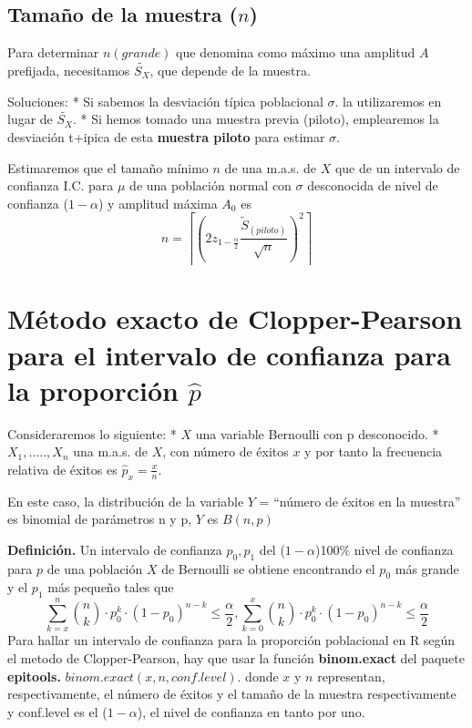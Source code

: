 \documentclass[
]{article}
\begin{document}
\hypertarget{tamauxf1o-de-la-muestra-n}{%
\subsection{\texorpdfstring{Tamaño de la muestra
(\(n\))}{Tamaño de la muestra (n)}}\label{tamauxf1o-de-la-muestra-n}}

Para determinar \(n (grande)\) que denomina como máximo una amplitud
\(A\) prefijada, necesitamos \(\tilde{S_X}\), que depende de la muestra.

Soluciones: * Si sabemos la desviación típica poblacional \(\sigma\). la
utilizaremos en lugar de \(\tilde{S_X}\). * Si hemos tomado una muestra
previa (piloto), emplearemos la desviación t+ipica de esta
\textbf{muestra piloto} para estimar \(\sigma\).

Estimaremos que el tamaño mínimo \(n\) de una m.a.s. de \(X\) que de un
intervalo de confianza I.C. para \(\mu\) de una población normal con
\(\sigma\) desconocida de nivel de confianza (\(1-\alpha\)) y amplitud
máxima \(A_0\) es
\[n = \left\lceil\left(2z_{1-\frac{\alpha}{2}}\frac{\tilde{S}_(piloto)}{\sqrt{n}}\right)^2\right\rceil\]

\hypertarget{muxe9todo-exacto-de-clopper-pearson-para-el-intervalo-de-confianza-para-la-proporciuxf3n-hatp}{%
\section{\texorpdfstring{Método exacto de Clopper-Pearson para el
intervalo de confianza para la proporción
\(\hat{p}\)}{Método exacto de Clopper-Pearson para el intervalo de confianza para la proporción \textbackslash hat\{p\}}}\label{muxe9todo-exacto-de-clopper-pearson-para-el-intervalo-de-confianza-para-la-proporciuxf3n-hatp}}

Consideraremos lo siguiente: * \(X\) una variable Bernoulli con p
desconocido. * \(X_1,.....,X_n\) una m.a.s. de \(X\), con número de
éxitos \(x\) y por tanto la frecuencia relativa de éxitos es
\(\hat{p}_x = \frac{x}{n}\).

En este caso, la distribución de la variable \(Y\) = ``número de éxitos
en la muestra'' es binomial de parámetros n y p, \(Y\) es \(B(n,p)\)

\textbf{Definición.} Un intervalo de confianza \(p_0,p_1\) del
(\(1 -\alpha\))100\% nivel de confianza para \(p\) de una población
\(X\) de Bernoulli se obtiene encontrando el \(p_0\) más grande y el
\(p_1\) más pequeño tales que
\[\sum_{k=x}^{n}\binom{n}{k} \cdot p^k_0 \cdot (1-p_0)^{n-k} \leq \frac{\alpha}{2}, \sum_{k=0}^{x}\binom{n}{k} \cdot p^k_0 \cdot (1-p_0)^{n-k} \leq \frac{\alpha}{2}\]
Para hallar un intervalo de confianza para la proporción poblacional en
R según el metodo de Clopper-Pearson, hay que usar la función
\textbf{binom.exact} del paquete \textbf{epitools.}
\(binom.exact(x,n,conf.level)\). donde \(x\) y \(n\) representan,
respectivamente, el número de éxitos y el tamaño de la muestra
respectivamente y conf.level es el (\(1-\alpha\)), el nivel de confianza
en tanto por uno.
\end{document}
